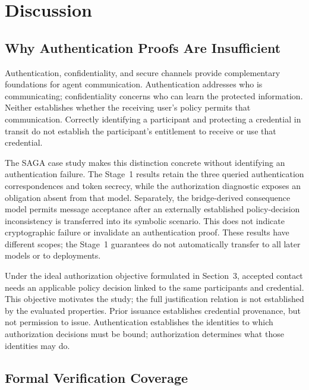 \section{Discussion}
\label{sec:discussion}

\subsection{Why Authentication Proofs Are Insufficient}

Authentication, confidentiality, and secure channels provide complementary
foundations for agent communication. Authentication addresses who is
communicating; confidentiality concerns who can learn the protected
information. Neither establishes whether the receiving user's policy
permits that communication. Correctly identifying a participant and
protecting a credential in transit do not establish the participant's
entitlement to receive or use that credential.

The SAGA case study makes this distinction concrete without identifying an
authentication failure. The Stage~1 results retain the three queried
authentication correspondences and token secrecy, while the authorization
diagnostic exposes an obligation absent from that model. Separately, the
bridge-derived consequence model permits message acceptance after an
externally established policy-decision inconsistency is transferred into
its symbolic scenario. This does not indicate cryptographic failure or
invalidate an authentication proof. These results have
different scopes; the Stage~1 guarantees do not automatically transfer to
all later models or to deployments.

Under the ideal authorization objective formulated in Section~3, accepted
contact needs an applicable policy decision linked to the same participants
and credential. This objective motivates the study; the full justification
relation is not established by the evaluated properties. Prior issuance
establishes credential provenance, but not permission to issue.
Authentication establishes the identities to which authorization decisions
must be bound; authorization determines what those identities may do.


\subsection{Formal Verification Coverage}

